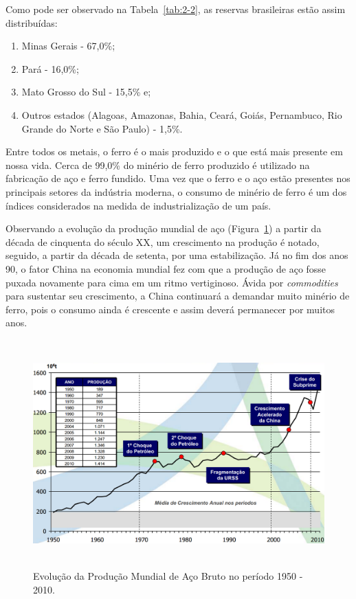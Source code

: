 Como pode ser observado na Tabela~\ref{tab:2-2}, as reservas
brasileiras estão assim distribuídas:

\begin{enumerate}[label=(\roman{*})]
  \item Minas Gerais - 67,0\%;
  \item Pará - 16,0\%;
  \item Mato Grosso do Sul - 15,5\% e;
  \item Outros estados (Alagoas, Amazonas, Bahia, Ceará, Goiás,
    Pernambuco, Rio Grande do Norte e São Paulo) - 1,5\%.
\end{enumerate} 

Entre todos os metais, o ferro é o mais produzido e o que está mais
presente em nossa vida. Cerca de 99,0\% do minério de ferro produzido
é utilizado na fabricação de aço e ferro fundido.  Uma vez que o ferro
e o aço estão presentes nos principais setores da indústria moderna, o
consumo de minério de ferro é um dos índices considerados na medida de
industrialização de um país.\cite{22,23}

Observando a evolução da produção mundial de aço
(Figura~\ref{fig:2-1}) a partir da década de cinquenta do século XX,
um crescimento na produção é notado, seguido, a partir da década de
setenta, por uma estabilização.  Já no fim dos anos 90, o fator China
na economia mundial fez com que a produção de aço fosse puxada
novamente para cima em um ritmo vertiginoso.  Ávida por
\textit{commodities} para sustentar seu crescimento, a China
continuará a demandar muito minério de ferro, pois o consumo ainda é
crescente e assim deverá permanecer por muitos anos.\cite{24}

\begin{figure} [h]
  \begin{center}
    \includegraphics[height=248pt,width=400pt]{images/fig2-1}
    \caption{Evolução da Produção Mundial de Aço Bruto no período 1950
      - 2010.\cite{24}}\label{fig:2-1}
  \end{center}
\end{figure}
 
